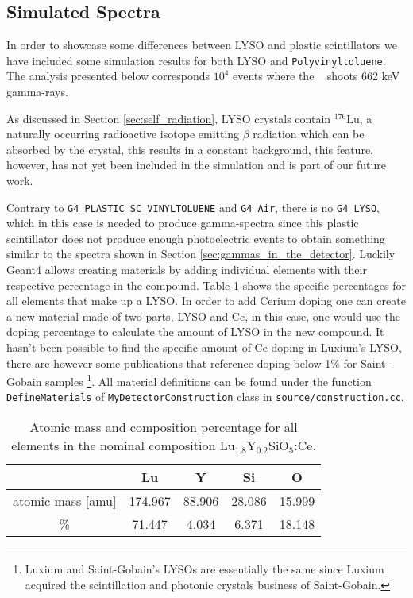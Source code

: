 \subsection{Simulated Spectra}\label{sec:simulated_spectra}

In order to showcase some differences between LYSO and plastic scintillators we have included some simulation results for both LYSO and \texttt{Polyvinyltoluene}. The analysis presented below corresponds $10^4$ events where the \gps~ shoots 662 \unit{\kilo\eV} gamma-rays.

As discussed in Section \ref{sec:self_radiation}, LYSO crystals contain $^{176}$Lu, a naturally occurring radioactive isotope emitting $\beta$ radiation which can be absorbed by the crystal, this results in a constant background, this feature, however, has not yet been included in the simulation and is part of our future work.

Contrary to \texttt{G4\_PLASTIC\_SC\_VINYLTOLUENE} and \texttt{G4\_Air}, there is no \texttt{G4\_LYSO}, which in this case is needed to produce gamma-spectra since this plastic scintillator does not produce enough photoelectric events to obtain something similar to the spectra shown in Section \ref{sec:gammas_in_the_detector}. Luckily Geant4 allows creating materials by adding individual elements with their respective percentage in the compound. Table \ref{tab:LYSO_composition} shows the specific percentages for all elements that make up a LYSO. In order to add Cerium doping one can create a new material made of two parts, LYSO and Ce, in this case, one would use the doping percentage to calculate the amount of LYSO in the new compound. It hasn't been possible to find the specific amount of Ce doping in Luxium's LYSO, there are however some publications that reference doping below 1\% for Saint-Gobain samples \cite{Ce_doping,Ce_dopping_2}\footnote{Luxium and Saint-Gobain's LYSOs are essentially the same since Luxium acquired the scintillation and photonic crystals business of Saint-Gobain.}. All material definitions can be found under the function \texttt{DefineMaterials} of \texttt{MyDetectorConstruction} class in \texttt{source/construction.cc}.

\begin{table}[H]
  \caption{Atomic mass and composition percentage for all elements in the nominal composition Lu$_{1.8}$Y$_{0.2}$SiO$_5$:Ce.}
  \centering
  \begin{tabular}{ c c c c c}
    \midrule
     & Lu & Y & Si & O \\
    \midrule
    atomic mass [amu] & 174.967 & 88.906 & 28.086 & 15.999 \\
    \% & 71.447 & 4.034 & 6.371 & 18.148 \\
    \bottomrule
  \end{tabular}
  \label{tab:LYSO_composition}
\end{table}

